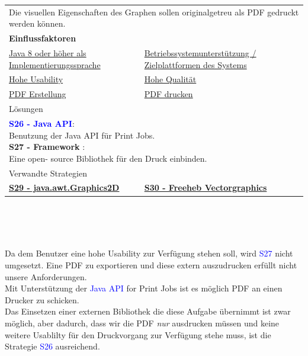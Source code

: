 \documentclass[enabledeprecatedfontcommands,fontsize=11pt,paper=a4,twoside]{scrartcl}
\newcounter{one}
\newcommand{\cb}[1]{{\textcolor{blue}{#1}}}
\begin{document}
	\begin{tabular} {|p{8cm} p{8cm}|}
		\hline
		\rowcolor{prob}\multicolumn{2}{|l|}{\parbox{16cm}{\textbf{09: PDF Druck}}} \\  \hline\hline 
		\multicolumn{2}{|l|}{\parbox{16cm}{Die visuellen Eigenschaften des Graphen sollen originalgetreu als PDF gedruckt werden können.}}\rule{0pt}{1ex}\\  \hline
		\multicolumn{2}{|l|}{\textbf{Einflussfaktoren}}\\
		\hyperlink{b}{Java 8 oder höher als Implementierungssprache} &
		\hyperlink {f}{Betriebssystemunterstützung / Zielplattformen des Systems}\\
		\hyperlink {g}{Hohe Usability}&
		\hyperlink {h}{Hohe Qualität}\\
		\hyperlink {kk}{PDF Erstellung} &
		\hyperlink {ll}{PDF drucken} 
		\\ \hline
		\multicolumn{2}{|l|}{Lösungen} \\
		\multicolumn{2}{|l|}{\parbox{16cm}{
				\textbf{\cb{\hypertarget{ggg}{S26 - Java API}}}: \\
				Benutzung der Java API für Print Jobs. \\
				\textbf{S27 - Framework }: \\
				Eine open- source Bibliothek für den Druck einbinden.
		} }\\ [7ex] \hline
		\multicolumn{2}{|l|}{Verwandte Strategien} \\
		\textbf{\hyperlink{hhh}{S29 - java.awt.Graphics2D}} &
		\textbf{\hyperlink{iii}{S30 - Freeheb Vectorgraphics}}
		\\\hline
	\end{tabular}\\ \\ \\
	\begin{onehalfspace}
		Da dem Benutzer eine hohe Usability zur Verfügung stehen soll, wird \cb{S27} nicht umgesetzt. Eine PDF zu exportieren und diese extern auszudrucken erfüllt nicht unsere Anforderungen. \\
		Mit Unterstützung der \cb{Java API} for Print Jobs ist es möglich PDF an einen Drucker zu schicken. \\
		Das Einsetzen einer externen Bibliothek die diese Aufgabe übernimmt ist zwar möglich, aber dadurch, dass wir die PDF \textit{nur} ausdrucken müssen und keine weitere Usablilty für den Druckvorgang zur Verfügung stehe muss, ist die Strategie \cb{S26} ausreichend.
	\end{onehalfspace}
\end{document}
